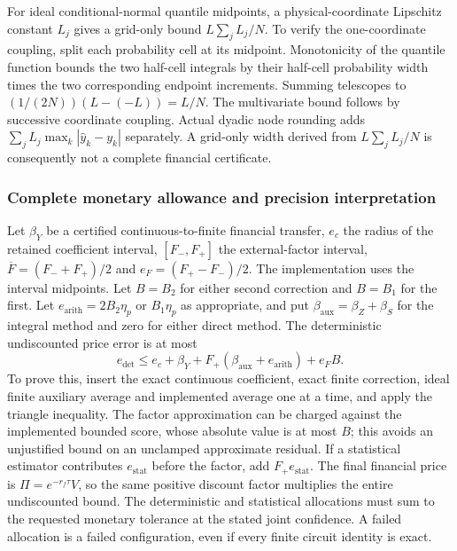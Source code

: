 For ideal conditional-normal quantile midpoints, a physical-coordinate
Lipschitz constant $L_j$ gives a grid-only bound $L\sum_jL_j/N$.
To verify the one-coordinate coupling, split each probability cell at its
midpoint.  Monotonicity of the quantile function bounds the two half-cell
integrals by their half-cell probability width times the two corresponding
endpoint increments.  Summing telescopes to
$(1/(2N))(L-(-L))=L/N$.  The multivariate bound follows by successive
coordinate coupling.  Actual dyadic node rounding adds
$\sum_jL_j\max_k|\widehat y_k-y_k|$ separately.  A grid-only width derived
from $L\sum_jL_j/N$ is consequently not a complete financial certificate.

\subsubsection{Complete monetary allowance and precision interpretation}

Let $\beta_Y$ be a certified continuous-to-finite financial transfer,
$e_c$ the radius of the retained coefficient interval, $[F_-,F_+]$ the
external-factor interval, $\overline F=(F_-+F_+)/2$ and
$e_F=(F_+-F_-)/2$.  The implementation uses the interval midpoints.
Let $B=B_2$ for either second correction and $B=B_1$ for the first.
Let $e_{\mathrm{arith}}=2B_2\eta_p$ or $B_1\eta_p$ as appropriate, and
put $\beta_{\mathrm{aux}}=\beta_Z+\beta_S$ for the integral method and zero
for either direct method.  The deterministic undiscounted price error is at most
\begin{equation}
 e_{\mathrm{det}}\leq
 e_c+\beta_Y+F_+(\beta_{\mathrm{aux}}+e_{\mathrm{arith}})+e_FB.
 \label{eq:iv-total-budget}
\end{equation}
To prove this, insert the exact continuous coefficient, exact finite correction,
ideal finite auxiliary average and implemented average one at a time, and
apply the triangle inequality.  The factor approximation can be charged
against the implemented bounded score, whose absolute value is at most $B$;
this avoids an unjustified bound on an unclamped approximate residual.
If a statistical estimator contributes $e_{\mathrm{stat}}$ before the factor,
add $F_+e_{\mathrm{stat}}$.  The final financial price is
$\Pi=e^{-r_f\tau}V$, so the same positive discount factor multiplies the
entire undiscounted bound.  The deterministic and statistical allocations must
sum to the requested monetary tolerance at the stated joint confidence.
A failed allocation is a failed configuration, even if every finite circuit
identity is exact.

